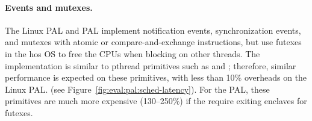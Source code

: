 \paragraph{Events and mutexes.}
The Linux PAL and \sgx{} PAL
implement notification events, synchronization events, and mutexes with atomic or compare-and-exchange
instructions,
but use futexes in the hos OS
to free the CPUs when blocking on other threads.
The implementation is similar
to pthread primitives such as  and ;
therefore, similar performance
is expected on these primitives, with less than 10\% overheads on the Linux PAL.
(see Figure~\ref{fig:eval:pal:sched-latency}).
For the \sgx{} PAL,
these primitives
are much more expensive
(\roughly{}130--250\%)
if the \hostapis{} require exiting enclaves
for futexes.









 



